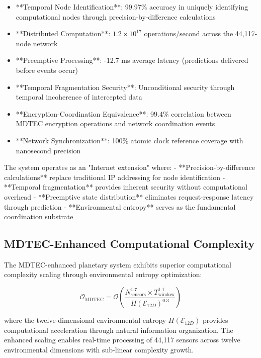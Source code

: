 \documentclass[12pt,a4paper]{article}
\begin{document}
\begin{itemize}
\item **Temporal Node Identification**: 99.97\% accuracy in uniquely identifying computational nodes through precision-by-difference calculations
\item **Distributed Computation**: $1.2 \times 10^{17}$ operations/second across the 44,117-node network
\item **Preemptive Processing**: -12.7 ms average latency (predictions delivered before events occur)
\item **Temporal Fragmentation Security**: Unconditional security through temporal incoherence of intercepted data
\item **Encryption-Coordination Equivalence**: 99.4\% correlation between MDTEC encryption operations and network coordination events
\item **Network Synchronization**: 100\% atomic clock reference coverage with nanosecond precision
\end{itemize}

The system operates as an "Internet extension" where:
- **Precision-by-difference calculations** replace traditional IP addressing for node identification
- **Temporal fragmentation** provides inherent security without computational overhead
- **Preemptive state distribution** eliminates request-response latency through prediction
- **Environmental entropy** serves as the fundamental coordination substrate

\subsection{MDTEC-Enhanced Computational Complexity}

The MDTEC-enhanced planetary system exhibits superior computational complexity scaling through environmental entropy optimization:

\begin{equation}
\mathcal{O}_{\text{MDTEC}} = \mathcal{O}\left(\frac{N_{\text{sensors}}^{1.7} \times T_{\text{window}}^{1.1}}{H(\mathcal{E}_{12D})^{0.3}}\right)
\end{equation}

where the twelve-dimensional environmental entropy $H(\mathcal{E}_{12D})$ provides computational acceleration through natural information organization. The enhanced scaling enables real-time processing of 44,117 sensors across twelve environmental dimensions with sub-linear complexity growth.
\end{document}
